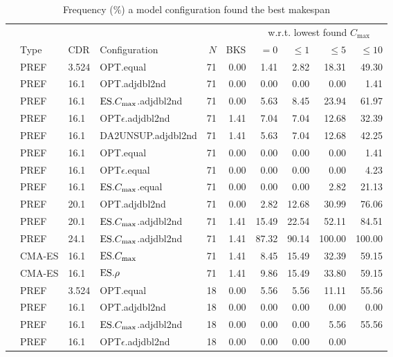 \begin{table}
\noindent
\caption[Frequency of finding best makespan]{Frequency ($\%$) a model 
configuration
    found the best makespan}
\centering
{\setlength{\tabcolsep}{3pt}
\begin{tabular}{llllrrrrrr}
\toprule
& & & & & & \multicolumn{4}{c}{w.r.t. lowest found $C_{\max}$} \\ 
\cmidrule(r){7-10}
& Type & CDR & Configuration & $N$ & BKS & $=0$ & $\leq1$ & $\leq5$ & $\leq10$ 
\\ 
\midrule
\multirow{13}{*}{\rot{\JSP}}
& PREF & 3.524 & OPT.equal & 71 & 0.00 & 1.41 & 2.82 & 18.31 & 49.30 \\ 
& PREF & 16.1 & OPT.adjdbl2nd & 71 & 0.00 & 0.00 & 0.00 & 0.00 & 1.41 \\ 
& PREF & 16.1 & $\text{ES}.{C_{\max}}$.adjdbl2nd & 71 & 0.00 & 5.63 & 8.45 & 23.94 & 61.97 
 \\ 
& PREF & 16.1 & OPT$\epsilon$.adjdbl2nd & 71 & 1.41 & 7.04 & 7.04 & 12.68 & 
32.39 \\ 
& PREF & 16.1 & DA2UNSUP.adjdbl2nd & 71 & 1.41 & 5.63 & 7.04 & 12.68 & 42.25 
 \\ 
& PREF & 16.1 & OPT.equal & 71 & 0.00 & 0.00 & 0.00 & 0.00 & 1.41 \\ 
& PREF & 16.1 & OPT$\epsilon$.equal & 71 & 0.00 & 0.00 & 0.00 & 0.00 & 4.23 \\ 
& PREF & 16.1 & $\text{ES}.{C_{\max}}$.equal & 71 & 0.00 & 0.00 & 0.00 & 2.82 & 21.13 \\ 
& PREF & 20.1 & OPT.adjdbl2nd & 71 & 0.00 & 2.82 & 12.68 & 30.99 & 76.06 \\ 
& PREF & 20.1 & $\text{ES}.{C_{\max}}$.adjdbl2nd & 71 & 1.41 & 15.49 & 22.54 & 52.11 & 
 84.51 \\ 
& PREF & 24.1 & $\text{ES}.{C_{\max}}$.adjdbl2nd & 71 & 1.41 & 87.32 & 90.14 & 100.00 & 
 100.00 \\ \cmidrule(r){2-10}
 & CMA-ES & 16.1 & $\text{ES}.{C_{\max}}$ & 71 & 1.41 & 8.45 & 15.49 & 32.39 & 59.15 \\ 
 & CMA-ES & 16.1 & $\text{ES}.{\rho}$ & 71 & 1.41 & 9.86 & 15.49 & 33.80 & 59.15 \\ 
\midrule \multirow{13}{*}{\rot{\FSP}}
& PREF & 3.524 & OPT.equal & 18 & 0.00 & 5.56 & 5.56 & 11.11 & 55.56 \\ 
& PREF & 16.1 & OPT.adjdbl2nd & 18 & 0.00 & 0.00 & 0.00 & 0.00 & 0.00 \\ 
& PREF & 16.1 & $\text{ES}.{C_{\max}}$.adjdbl2nd & 18 & 0.00 & 0.00 & 0.00 & 5.56 & 55.56 
 \\ 
& PREF & 16.1 & OPT$\epsilon$.adjdbl2nd & 18 & 0.00 & 0.00 & 0.00 & 0.00 & 

\end{tabular}}
\end{table}
